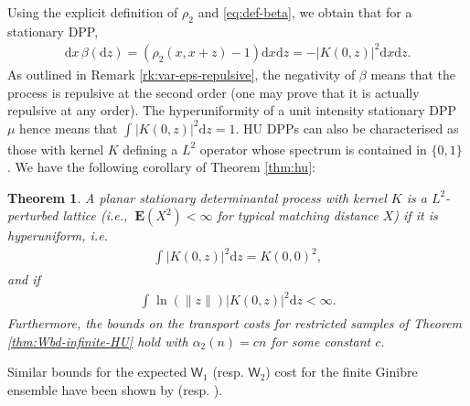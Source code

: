 \documentclass[12pt]{article}
\newtheorem{theorem}{Theorem}
\newcommand{\1}{\mathbf{1}}
\newcommand{\md}{\mathrm{d}}
\begin{document}
{{{{Using the explicit definition of $\rho_2$ and \eqref{eq:def-beta}, we obtain that for a stationary DPP,
\begin{align*}\md x \, \beta (\md z) =(\rho _{2}(x,x + z)-1)\md x\md z =   - | K(0,z) | ^{2}\md x\md z.
\end{align*}
%
As outlined in Remark  \ref{rk:var-eps-repulsive}, the negativity of $ \beta $ means that the process is repulsive at the second order (one may prove that it is actually repulsive at any order).  The hyperuniformity of a unit intensity stationary DPP $ \mu $ hence means that $ \int_{} | K(0,z) | ^{2}\md z =  1$. HU DPPs can also be characterised as those {with kernel $ K$ defining a $ L^{2}$ operator whose} spectrum is contained in $ \{0, 1\} $  \cite{hough2009zeros}. We have the following corollary of Theorem \ref{thm:hu}:\begin{theorem}
 A planar stationary determinantal process with  kernel $ K$ is a $L^{2}$-perturbed lattice  ({i.e., $\ \mathbf{E}(X^2) < \infty$ for typical matching distance $X$}) if it is hyperuniform, i.e.
\begin{align*}\int_{}| K(0,z) | ^{2}\md z =  K(0,0)^{2},
\end{align*}
and if
\begin{align*}\int_{}\ln( \| z \| )| K(0,z) | ^{2}\md z<\infty .
\end{align*}
Furthermore, the bounds on the transport costs for restricted samples of Theorem \ref{thm:Wbd-infinite-HU} hold  with {$\alpha_2(n) = cn$ for some constant $c$.}
 \end{theorem}
%
Similar bounds for the expected $   \mathsf W_{ 1}$ (resp. $   \mathsf W_{2}$) cost for the finite Ginibre ensemble have been shown by  \cite{jalowy2021wasserstein} (resp.  \cite{prod2021contributions}).
%
%
}}}}
\end{document}
